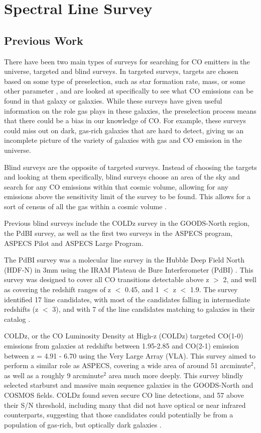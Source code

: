 \chapter{Spectral Line Survey}

\section{Previous Work}

There have been two main types of surveys for searching for CO emitters in the universe, targeted and blind surveys. In targeted surveys, targets are chosen based on some type of preselection, such as star formation rate, mass, or some other parameter \cite{walter2016alma, decarli2019alma}, and are looked at specifically to see what CO emissions can be found in that galaxy or galaxies. While these surveys have given useful information on the role gas plays in these galaxies, the preselection process means that there could be a bias in our knowledge of CO. For example, these surveys could miss out on dark, gas-rich galaxies that are hard to detect, giving us an incomplete picture of the variety of galaxies with gas and CO emission in the universe. 

Blind surveys are the opposite of targeted surveys. Instead of choosing the targets and looking at them specifically, blind surveys choose an area of the sky and search for any CO emissions within that cosmic volume, allowing for any emissions above the sensitivity limit of the survey to be found. This allows for a sort of census of all the gas within a cosmic volume \cite{decarli2019alma}. 

Previous blind surveys include the COLDz survey in the GOODS-North region, the PdBI survey, as well as the first two surveys in the ASPECS program, ASPECS Pilot and ASPECS Large Program. 

The PdBI survey was a molecular line survey in the Hubble Deep Field North (HDF-N) in 3mm using the IRAM Plateau de Bure Interferometer (PdBI) \cite{decarli2014molecular}. This survey was designed to cover all CO transitions detectable above z $>$ 2, and well as covering the redshift ranges of z $<$ 0.45, and 1 $<$ z $<$ 1.9. The survey identified 17 line candidates, with most of the candidates falling in intermediate redshifts (z $<$ 3), and with 7 of the line candidates matching to galaxies in their catalog \cite{decarli2014molecular}. 

COLDz, or the CO Luminosity Density at High-z (COLDz) targeted CO(1-0) emissions from galaxies at redshifts between 1.95-2.85 and CO(2-1) emission between z = 4.91 - 6.70 using the Very Large Array (VLA)\cite{pavesi2018co}. This survey aimed to perform a similar role as ASPECS, covering a wide area of around 51 arcminute$^2$, as well as a roughly 9 arcminute$^2$ area much more deeply. This survey blindly selected starburst and massive main sequence galaxies in the GOODS-North and COSMOS fields. COLDz found seven secure CO line detections, and 57 above their S/N threshold, including many that did not have optical or near infrared counterparts, suggesting that those candidates could potentially be from a population of gas-rich, but optically dark galaxies \cite{pavesi2018co}.

